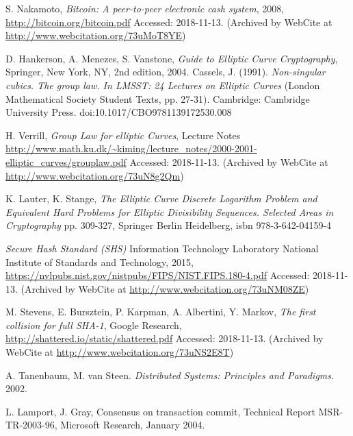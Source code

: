 \documentclass[final, 12pt,oneside]{class_diss}
\begin{document}
%
\begin{thebibliography}{10}
S. Nakamoto, \textit{Bitcoin: A peer-to-peer electronic cash system}, 2008, \url{http://bitcoin.org/bitcoin.pdf}  Accessed: 2018-11-13. (Archived by WebCite at \url{http://www.webcitation.org/73uMoT8YE})

  D. Hankerson, A. Menezes, S. Vanstone,
  \textit{Guide to Elliptic Curve Cryptography},
  \newline Springer, New York, NY,
  2nd edition,
  2004.
Cassels, J. (1991). 
\textit{Non-singular cubics. The group law. In LMSST: 24 Lectures on Elliptic Curves}
 (London Mathematical Society Student Texts, pp. 27-31). Cambridge: Cambridge University Press. doi:10.1017/CBO9781139172530.008
 
 H. Verrill, \textit{Group Law for elliptic Curves}, Lecture Notes \url{http://www.math.ku.dk/~kiming/lecture_notes/2000-2001-elliptic_curves/grouplaw.pdf} Accessed: 2018-11-13. (Archived by WebCite at \url{http://www.webcitation.org/73uN8g2Qm})
 
K. Lauter, K. Stange, \textit{The Elliptic Curve Discrete Logarithm Problem and Equivalent Hard Problems for Elliptic Divisibility Sequences. Selected Areas in Cryptography} pp. 309-327, Springer Berlin Heidelberg, isbn 978-3-642-04159-4
 
\textit{Secure Hash Standard (SHS)} Information Technology Laboratory National Institute of Standards and Technology, 2015,  \url{https://nvlpubs.nist.gov/nistpubs/FIPS/NIST.FIPS.180-4.pdf} Accessed: 2018-11-13. (Archived by WebCite at \url{http://www.webcitation.org/73uNM08ZE}) 

M. Stevens, E. Bursztein, P. Karpman, A. Albertini, Y. Markov, \textit{The first collision for full SHA-1}, Google Research, \url{http://shattered.io/static/shattered.pdf} Accessed: 2018-11-13. (Archived by WebCite at \url{http://www.webcitation.org/73uNS2E8T}) 
 
 A. Tanenbaum, M. van Steen. 
 \textit{Distributed Systems: Principles and Paradigms.} 2002.
 
L. Lamport, J. Gray, Consensus on transaction commit, Technical
Report MSR-TR-2003-96, Microsoft Research, January 2004.



\end{thebibliography}
\end{document}
